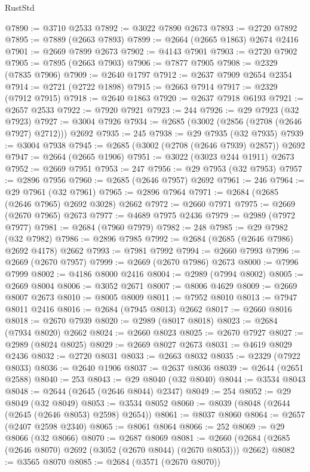 \begin{lexlean}{RustStd}
\begin{coremodule}
@7890 := @3710 @2533
@7892 := @3022 @7890 @2673
@7893 := @2720 @7892
@7895 := @7889 (@2663 @7893)
@7899 := @2664 (@2665 @1863) @2674 @2416
@7901 := @2669 @7899 @2673
@7902 := @4143 @7901
@7903 := @2720 @7902
@7905 := @7895 (@2663 @7903)
@7906 := @7877 @7905
@7908 := @2329 (@7835 @7906)
@7909 := @2640 @1797
@7912 := @2637 @7909 @2654 @2354
@7914 := @2721 (@2722 @1898)
@7915 := @2663 @7914
@7917 := @2329 (@7912 @7915)
@7918 := @2640 @1863
@7920 := @2637 @7918 @6193
@7921 := @2657 @2533
@7922 := @7920 @7921
@7923 := 244
@7926 := @29 @7923 (@32 @7923)
@7927 := @3004 @7926
@7934 := @2685 (@3002 (@2856 (@2708 (@2646 @7927) @2712))) @2692
@7935 := 245
@7938 := @29 @7935 (@32 @7935)
@7939 := @3004 @7938
@7945 := @2685 (@3002 (@2708 (@2646 @7939) @2857)) @2692
@7947 := @2664 (@2665 @1906)
@7951 := @3022 (@3023 @244 @1911) @2673
@7952 := @2669 @7951
@7953 := 247
@7956 := @29 @7953 (@32 @7953)
@7957 := @2896 @7956
@7960 := @2685 (@2646 @7957) @2692
@7961 := 246
@7964 := @29 @7961 (@32 @7961)
@7965 := @2896 @7964
@7971 := @2684 (@2685 (@2646 @7965) @2692 @3028) @2662
@7972 := @2660 @7971
@7975 := @2669 (@2670 @7965) @2673
@7977 := @4689 @7975 @2436
@7979 := @2989 (@7972 @7977)
@7981 := @2684 (@7960 @7979)
@7982 := 248
@7985 := @29 @7982 (@32 @7982)
@7986 := @2896 @7985
@7992 := @2684 (@2685 (@2646 @7986) @2692 @4178) @2662
@7993 := @7981 @7992
@7994 := @2660 @7993
@7996 := @2669 (@2670 @7957)
@7999 := @2669 (@2670 @7986) @2673
@8000 := @7996 @7999
@8002 := @4186 @8000 @2416
@8004 := @2989 (@7994 @8002)
@8005 := @2669 @8004
@8006 := @3052 @2671
@8007 := @8006 @4629
@8009 := @2669 @8007 @2673
@8010 := @8005 @8009
@8011 := @7952 @8010
@8013 := @7947 @8011 @2416
@8016 := @2684 (@7945 @8013) @2662
@8017 := @2660 @8016
@8018 := @2670 @7939
@8020 := @2989 (@8017 @8018)
@8023 := @2684 (@7934 @8020) @2662
@8024 := @2660 @8023
@8025 := @2670 @7927
@8027 := @2989 (@8024 @8025)
@8029 := @2669 @8027 @2673
@8031 := @4619 @8029 @2436
@8032 := @2720 @8031
@8033 := @2663 @8032
@8035 := @2329 (@7922 @8033)
@8036 := @2640 @1906
@8037 := @2637 @8036
@8039 := @2644 (@2651 @2588)
@8040 := 253
@8043 := @29 @8040 (@32 @8040)
@8044 := @3534 @8043
@8048 := @2644 (@2645 (@2646 @8044) @2347)
@8049 := 254
@8052 := @29 @8049 (@32 @8049)
@8053 := @3534 @8052
@8060 := @8039 (@8048 (@2644 (@2645 (@2646 @8053) @2598) @2654))
@8061 := @8037 @8060
@8064 := @2657 (@2407 @2598 @2340)
@8065 := @8061 @8064
@8066 := 252
@8069 := @29 @8066 (@32 @8066)
@8070 := @2687 @8069
@8081 := @2660 (@2684 (@2685 (@2646 @8070) @2692 (@3052 (@2670 @8044) (@2670 @8053))) @2662)
@8082 := @3565 @8070
@8085 := @2684 (@3571 (@2670 @8070))

\end{coremodule}
\end{lexlean}
